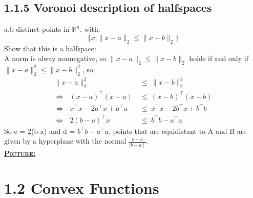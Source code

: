 \documentclass{report}
\begin{document}
	\subsection*{1.1.5 Voronoi description of halfspaces}
	a,b distinct points in $\mathbb{R}^n$, with:
	\[
	\{x\mid \| x-a \|_2 \leq \| x-b \|_2\}
	\]
	Show that this is a halfspace: \\
	A norm is alway nonnegative, so $\| x-a \|_2 \leq \| x-b \|_2$ holds if and only if $\| x-a \|^2_2 \leq \| x-b \|^2_2$, so:
	\begin{align*}
		\| x-a \|^2_2 \ & \leq \ \| x-b \|^2_2 \\
		\Leftrightarrow \ \ \ (x-a)^{\top}(x-a) \ & \leq \ (x-b)^{\top}(x-b) \\
		\Leftrightarrow \ \ \ x^{\top}x - 2a^{\top}x + a^{\top}a \ & \leq \ x^{\top}x - 2b^{\top}x + b^{\top}b \\
		\Leftrightarrow \ \ \ 2(b-a)^{\top}x \ & \leq \ b^{\top}b - a^{\top}a	
	\end{align*}
	So c = 2(b-a) and d = $b^{\top}b - a^{\top}a$, points that are equidistant to A and B are given by a hyperplane with the normal $\frac{b-a}{\mid b-a \mid}$. \\
	\textbf{\textsc{\underline{Picture:}}} \\
	
	\section*{1.2 Convex Functions}
\end{document}
